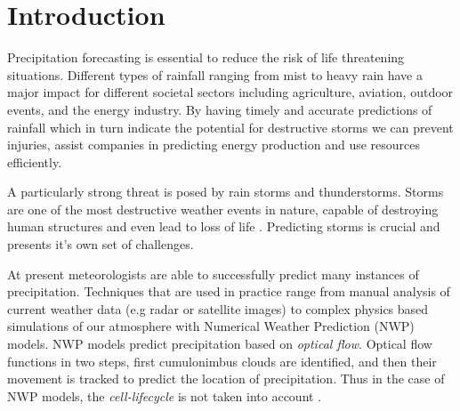 \documentclass[acmtog, authorversion]{acmart}
\begin{document}
\section{Introduction}

Precipitation forecasting is essential to reduce the risk of life threatening situations. Different types of rainfall ranging from mist to heavy rain have a major impact for different societal sectors including agriculture, aviation, outdoor events, and the energy industry.
By having timely and accurate predictions of rainfall which in turn indicate the potential for destructive storms we can prevent injuries, assist companies in predicting energy production and use resources efficiently.
\medskip


A particularly strong threat is posed by rain storms and thunderstorms. Storms are one of the most destructive weather events in nature, capable of destroying human structures and even lead to loss of life \cite{noaa-national-severe-storms-laboratory-no-date}. Predicting storms is crucial and presents it's own set of challenges.
\medskip

At present meteorologists are able to successfully predict many instances of precipitation. Techniques that are used in practice range from manual analysis of current weather data (e.g radar or satellite images) to complex physics based simulations of our atmosphere with Numerical Weather Prediction (\textsc{NWP}) models.
\textsc{NWP} models predict precipitation based on \textit{optical flow}. Optical flow functions in two steps, first cumulonimbus clouds are identified, and then their movement is tracked to predict the location of precipitation. Thus in the case of \textsc{NWP} models, the \textit{cell-lifecycle} \cite{noaas-national-weather-service-no-date} is not taken into account \cite{prudden2020review}.
\medskip
\end{document}
